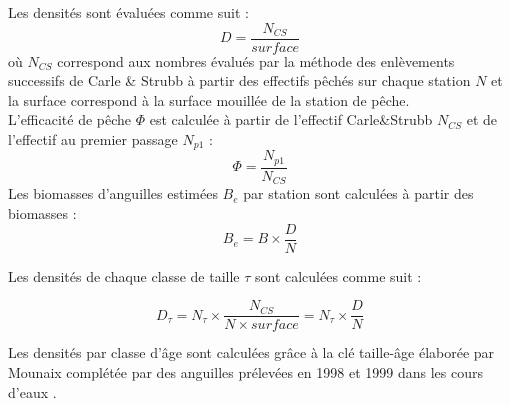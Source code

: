 \documentclass[10pt,twocolumn,titlepage,twoside]{article}\usepackage[]{graphicx}\usepackage[]{color}
\begin{document}
Les densités sont évaluées comme suit :
\begin{equation*}
D=\frac{N_{CS}}{surface}
\end{equation*}
où $N_{CS}$ correspond aux nombres évalués par la
méthode des enlèvements successifs de Carle \& Strubb
\citep{ogle_fsa_2013,carle_new_1978} à partir des effectifs pêchés sur chaque 
station $N$ et la surface correspond à la surface mouillée de la
station de pêche.\\

L'efficacité de pêche $\Phi$ est calculée à partir de l'effectif
Carle\&Strubb $N_{CS}$ et de l'effectif au premier passage
$N_{p1}$ :
\begin{equation*}
\Phi=\frac{N_{p1}}{N_{CS}}
\end{equation*}
Les biomasses d'anguilles estimées
$B_e$
par station sont calculées à partir des biomasses :
\begin{equation*}
B_e=B\times \frac{D}{N}
\end{equation*}

Les densités de chaque classe de taille $\tau$ sont calculées comme
suit :

\begin{equation*}
 D_{\tau}=N_{\tau} \times \frac{N_{CS}}{N \times surface}= N_{\tau} \times \frac{D}{N}
\end{equation*}


Les densités par classe d'âge sont calculées grâce à la clé
taille-âge élaborée par Mounaix \citep{mounaix_intercalibration_1992} complétée par
des anguilles prélevées en 1998 et 1999 dans les cours
d'eaux \citep{briand_effect_2006}.
\end{document}
